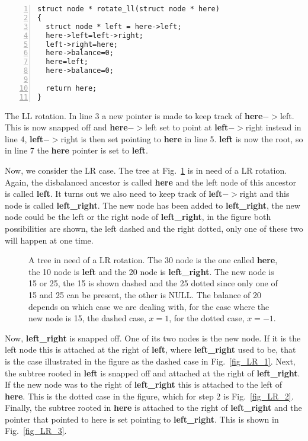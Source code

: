 \documentclass[11pt,a4paper]{scrartcl}
\begin{document}
\begin{table}
\begin{lstlisting}[numbers=left]
struct node * rotate_ll(struct node * here)
{
  struct node * left = here->left;
  here->left=left->right;
  left->right=here;
  here->balance=0;
  here=left;
  here->balance=0;

  return here;
}
\end{lstlisting}
\caption{The LL rotation. In line 3 a new pointer is made to keep
  track of {\bf here}$->$left. This is now snapped off and {\bf
    here}$->$left set to point at {\bf left}$->$right instead in line 4,
  {\bf left}$->$right is then set pointing to {\bf here} in line 5. {\bf
    left} is now the root, so in line 7 the {\bf here} pointer is set
  to {\bf left}.\label{c_LL}}
\end{table}

Now, we consider the LR case. The tree at Fig.~\ref{fig_LR} is in need
of a LR rotation. Again, the disbalanced ancestor is called {\bf here}
and the left node of this ancestor is called {\bf left}. It turns out
we also need to keep track of {\bf left}$->$right and this node is
called {\bf left\_right}. The new node has been added to {\bf
  left\_right}, the new node could be the left or the right node of
{\bf left\_right}, in the figure both possibilities are shown, the
left dashed and the right dotted, only one of these two will happen at
one time.

\begin{figure}
\begin{center}
\end{center}
\caption{A tree in need of a LR rotation. The 30 node is the one
  called {\bf here}, the 10 node is {\bf left} and the 20 node is {\bf
    left\_right}. The new node is 15 or 25, the 15 is shown dashed and
  the 25 dotted since only one of 15 and 25 can be present, the other
  is NULL. The balance of 20 depends on which case we are dealing
  with, for the case where the new node is 15, the dashed case, $x=1$,
  for the dotted case, $x=-1$.\label{fig_LR}}
\end{figure}

Now, {\bf left\_right} is snapped off. One of its two nodes is the new
node. If it is the left node this is attached at the right of {\bf
  left}, where {\bf left\_right} used to be, that is the case
illustrated in the figure as the dashed case in
Fig.~\ref{fig_LR_1}. Next, the subtree rooted in {\bf left} is snapped
off and attached at the right of {\bf left\_right}. If the new node
was to the right of {\bf left\_right} this is attached to the left of
{\bf here}. This is the dotted case in the figure, which for step 2 is
Fig.~\ref{fig_LR_2}. Finally, the subtree rooted in {\bf here} is
attached to the right of {\bf left\_right} and the pointer that
pointed to here is set pointing to {\bf left\_right}. This is shown in
Fig.~\ref{fig_LR_3}.
\end{document}
